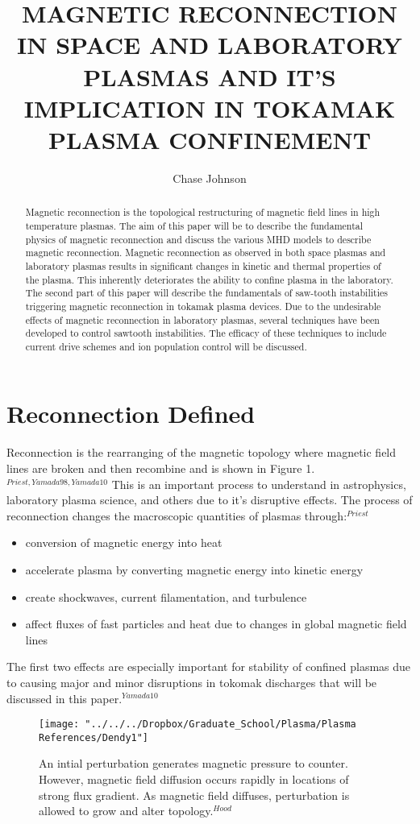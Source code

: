 \documentclass{article}
\begin{document}
\title{MAGNETIC RECONNECTION IN SPACE AND LABORATORY PLASMAS AND IT’S IMPLICATION IN TOKAMAK PLASMA CONFINEMENT}
\author{Chase Johnson}

\maketitle

\begin{abstract}
Magnetic reconnection is the topological restructuring of magnetic field lines in high temperature plasmas.    The aim of this paper will be to describe the fundamental physics of magnetic reconnection and discuss the various MHD models to describe magnetic reconnection.  Magnetic reconnection as observed in both space plasmas and laboratory plasmas results in significant changes in kinetic and thermal properties of the plasma.  This inherently deteriorates the ability to confine plasma in the laboratory.  The second part of this paper will describe the fundamentals of saw-tooth instabilities triggering magnetic reconnection in tokamak plasma devices.  Due to the undesirable effects of magnetic reconnection in laboratory plasmas, several techniques have been developed to control sawtooth instabilities.  The efficacy of these techniques to include current drive schemes and ion population control will be discussed.
\end{abstract}
\section{Reconnection Defined}
Reconnection is the rearranging of the magnetic topology where magnetic field lines are broken and then recombine and is shown in Figure 1.$^{Priest,Yamada98,Yamada10}$  This is an important process to understand in astrophysics, laboratory plasma science, and others due to it's disruptive effects.  The process of reconnection changes the macroscopic quantities of plasmas through:$^{Priest}$
\begin{itemize}
\item conversion of magnetic energy into heat
\item accelerate plasma by converting magnetic energy into kinetic energy
\item create shockwaves, current filamentation, and turbulence
\item affect fluxes of fast particles and heat due to changes in global magnetic field lines
\end{itemize}
The first two effects are especially important for stability of confined plasmas due to causing major and minor disruptions in tokomak discharges that will be discussed in this paper.$^{Yamada10}$
\begin{figure}[b]
\centering
\texttt{[image: "../../../Dropbox/Graduate\_School/Plasma/Plasma References/Dendy1"]}
\caption{An intial perturbation generates magnetic pressure to counter. However, magnetic field diffusion occurs rapidly in locations of strong flux gradient. As magnetic field diffuses, perturbation is allowed to grow and alter topology.$^{Hood}$}
\label{fig:Dendy1}
\end{figure}
\end{document}
